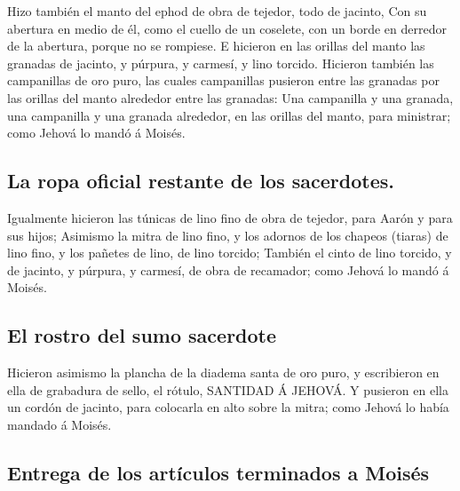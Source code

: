  Hizo también el manto del ephod de obra de tejedor, todo
de jacinto,  Con su abertura en medio de él, como el cuello
de un coselete, con un borde en derredor de la abertura, porque no se
rompiese.  E hicieron en las orillas del manto las granadas
de jacinto, y púrpura, y carmesí, y lino torcido.  Hicieron
también las campanillas de oro puro, las cuales campanillas pusieron
entre las granadas por las orillas del manto alrededor entre las
granadas:  Una campanilla y una granada, una campanilla y
una granada alrededor, en las orillas del manto, para ministrar; como
Jehová lo mandó á Moisés.

\hypertarget{la-ropa-oficial-restante-de-los-sacerdotes.}{%
\subsection{La ropa oficial restante de los
sacerdotes.}\label{la-ropa-oficial-restante-de-los-sacerdotes.}}

 Igualmente hicieron las túnicas de lino fino de obra de
tejedor, para Aarón y para sus hijos;  Asimismo la mitra de
lino fino, y los adornos de los chapeos (tiaras) de lino fino, y los
pañetes de lino, de lino torcido;  También el cinto de lino
torcido, y de jacinto, y púrpura, y carmesí, de obra de recamador; como
Jehová lo mandó á Moisés.

\hypertarget{el-rostro-del-sumo-sacerdote}{%
\subsection{El rostro del sumo
sacerdote}\label{el-rostro-del-sumo-sacerdote}}

 Hicieron asimismo la plancha de la diadema santa de oro
puro, y escribieron en ella de grabadura de sello, el rótulo, SANTIDAD Á
JEHOVÁ.  Y pusieron en ella un cordón de jacinto, para
colocarla en alto sobre la mitra; como Jehová lo había mandado á Moisés.

\hypertarget{entrega-de-los-artuxedculos-terminados-a-moisuxe9s}{%
\subsection{Entrega de los artículos terminados a
Moisés}\label{entrega-de-los-artuxedculos-terminados-a-moisuxe9s}}

